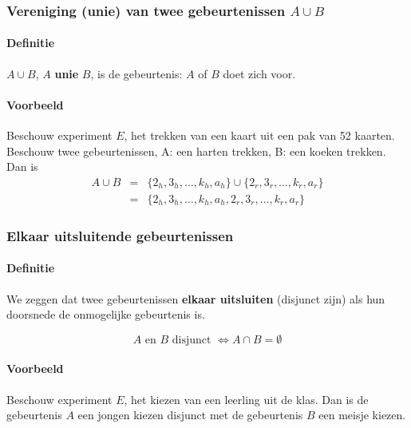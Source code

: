 \documentclass[12pt,a4paper,twoside]{article}
\begin{document}
\subsubsection{Vereniging (unie) van twee gebeurtenissen $A\cup B$}

\paragraph*{Definitie}
$A\cup B$, $A$ {\bf unie} $B$, is de gebeurtenis: $A$ of $B$ doet zich voor.

\paragraph*{Voorbeeld}
Beschouw experiment $E$, het trekken van een kaart uit een pak van 52 kaarten. Beschouw twee gebeurtenissen, A: een harten trekken, B: een koeken trekken. Dan is\\
\begin{eqnarray*}
A\cup B &=& \{2_h, 3_h, \ldots, k_h,a_h\}\cup\{2_r, 3_r, \ldots, k_r, a_r\}\\
        &=& \{2_h, 3_h, \ldots, k_h, a_h, 2_r, 3_r, \ldots, k_r, a_r\}
\end{eqnarray*}

\subsubsection{Elkaar uitsluitende gebeurtenissen}

\paragraph*{Definitie}
We zeggen dat twee gebeurtenissen {\bf elkaar uitsluiten} (disjunct zijn) als hun doorsnede
de onmogelijke gebeurtenis is.\\
\begin{mdframed}
$$A\mbox{ en }B\mbox{ disjunct }\Leftrightarrow A\cap B = \emptyset$$
\end{mdframed}

\paragraph*{Voorbeeld}
Beschouw experiment $E$, het kiezen van een leerling uit de klas. Dan is de gebeurtenis $A$ een jongen kiezen disjunct met de gebeurtenis $B$ een meisje kiezen.
\end{document}
